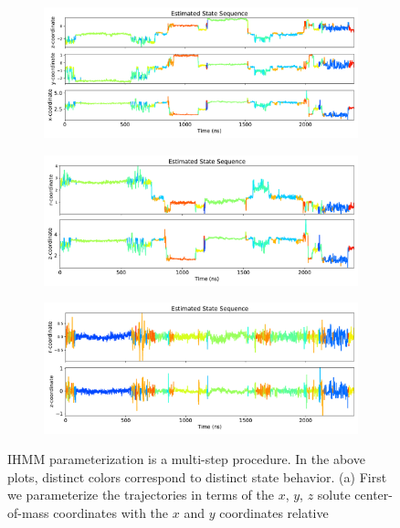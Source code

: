 \documentclass{article}
\begin{document}
  \begin{figure}
    \centering
	\begin{subfigure}{0.8\textwidth}
		\includegraphics[width=\textwidth]{xyz_hmm.pdf}
		\caption{}\label{fig:xyz_hmm}
	\end{subfigure}  	
	\begin{subfigure}{0.8\textwidth}
		\includegraphics[width=\textwidth]{rz_hmm.pdf}
		\caption{}\label{fig:rz_hmm}
	\end{subfigure}  
	\begin{subfigure}{0.8\textwidth}
		\includegraphics[width=\textwidth]{zeroed_hmm.pdf}
		\caption{}\label{fig:zeroed_hmm}
	\end{subfigure}  
	\caption{IHMM parameterization is a multi-step procedure. In the above plots, distinct colors
	correspond to distinct state behavior. (a) First we parameterize the trajectories in terms of
	the $x$, $y$, $z$ solute center-of-mass coordinates with the $x$ and $y$ coordinates relative
}
\end{figure}
\end{document}
